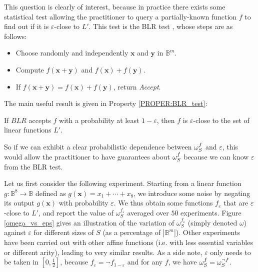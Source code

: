 This question is clearly of interest, because in practice there exists some
statistical test allowing the practitioner to query a partially-known function
$f$ to find out if it is $\varepsilon$-close to $L'$. This test is the BLR test
\cite{BluLubRub93}, whose steps are as follows:

\begin{itemize}
\item Choose randomly and independently $\mathbf{x}$ and $\mathbf{y}$ in
  $\mathbb{B}^m$.
\item Compute $f(\mathbf{x}+\mathbf{y})$ and $f(\mathbf{x}) + f(\mathbf{y})$.
\item If $f(\mathbf{x}+\mathbf{y}) = f(\mathbf{x}) + f(\mathbf{y})$, return
  \textit{Accept}.
\end{itemize}

The main useful result is given in Property \ref{PROPER:BLR_test}:
\begin{property}
  \label{PROPER:BLR_test}
  If $BLR$ accepts $f$ with a probability at least $1-\varepsilon$, then $f$ is
  $\varepsilon$-close to the set of linear functions $L'$.
\end{property}

So if we can exhibit a clear probabilistic dependence between $\omega_{S}^{f}$
and $\varepsilon$, this would allow the practitioner to have guarantees about
$\omega_{S}^{f}$ because we can know $\varepsilon$ from the BLR test.

Let us first consider the following experiment. Starting from a linear function $g
\colon \mathbb{B}^8 \to \mathbb{B}$ defined as  $g(\mathbf{x}) = x_1 + \cdots +
x_8$, we introduce some noise by negating its output $g(\mathbf{x})$ with
probability $\varepsilon$. We thus obtain some functions $f_{\varepsilon}$ that are
$\varepsilon$-close to $L'$, and report the value of $\omega_S^{f_\varepsilon}$ averaged over $50$
experiments.  Figure \ref{omega_vs_eps} gives an
illustration of the variation of $\omega_S^{f_\varepsilon}$ (simply denoted
$\omega$) against  $\varepsilon$ for different
sizes of $S$ (as a percentage of $|\mathbb{B}^m|$).  Other experiments have
been carried out with other affine functions (i.e.  with less essential
variables or different arity), leading to very similar results. As a side note,
$\varepsilon$ only needs to be taken in $[0, \frac{1}{2}]$, because $f_\varepsilon =
\neg f_{1 - \varepsilon}$ and for any $f$, we have $\omega_{S}^{f} = \omega_S^{\neg
f}$.

